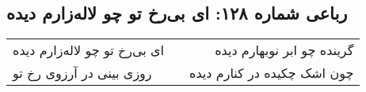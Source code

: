 \begin{center}
\section*{رباعی شماره ۱۲۸: ای بی‌رخ تو چو لاله‌زارم دیده}
\label{sec:128}
\begin{longtable}{l p{0.5cm} r}
ای بی‌رخ تو چو لاله‌زارم دیده
&&
گرینده چو ابر نوبهارم دیده
\\
روزی بینی در آرزوی رخ تو
&&
چون اشک چکیده در کنارم دیده
\\
\end{longtable}
\end{center}
